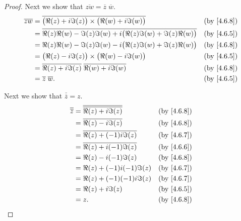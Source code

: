 \begin{proof}
  Next we show that \(\overline{zw} = \overline{z} \; \overline{w}\).
  \begin{align*}
    \overline{zw} & = \overline{\big(\Re(z) + i \Im(z)\big) \times \big(\Re(w) + i \Im(w)\big)}            &  & \text{(by \cref{4.6.8})} \\
                  & = \overline{\Re(z) \Re(w) - \Im(z) \Im(w) + i \big(\Re(z) \Im(w) + \Im(z) \Re(w)\big)} &  & \text{(by \cref{4.6.5})} \\
                  & = \Re(z) \Re(w) - \Im(z) \Im(w) - i \big(\Re(z) \Im(w) + \Im(z) \Re(w)\big)            &  & \text{(by \cref{4.6.8})} \\
                  & = \big(\Re(z) - i \Im(z)\big) \times \big(\Re(w) - i \Im(w)\big)                       &  & \text{(by \cref{4.6.5})} \\
                  & = \overline{\Re(z) + i \Im(z)} \; \overline{\Re(w) + i \Im(w)}                         &  & \text{(by \cref{4.6.8})} \\
                  & = \overline{z} \; \overline{w}.                                                        &  & \text{(by \cref{4.6.5})}
  \end{align*}

  Next we show that \(\overline{\overline{z}} = z\).
  \begin{align*}
    \overline{\overline{z}} & = \overline{\overline{\Re(z) + i \Im(z)}} &  & \text{(by \cref{4.6.8})} \\
                            & = \overline{\Re(z) - i \Im(z)}            &  & \text{(by \cref{4.6.8})} \\
                            & = \overline{\Re(z) + (-1) i \Im(z)}       &  & \text{(by \cref{4.6.7})} \\
                            & = \overline{\Re(z) + i (-1) \Im(z)}       &  & \text{(by \cref{4.6.6})} \\
                            & = \Re(z) - i (-1) \Im(z)                  &  & \text{(by \cref{4.6.8})} \\
                            & = \Re(z) + (-1) i (-1) \Im(z)             &  & \text{(by \cref{4.6.7})} \\
                            & = \Re(z) + (-1) (-1) i \Im(z)             &  & \text{(by \cref{4.6.7})} \\
                            & = \Re(z) + i \Im(z)                       &  & \text{(by \cref{4.6.5})} \\
                            & = z.                                      &  & \text{(by \cref{4.6.8})}
  \end{align*}


\end{proof}
